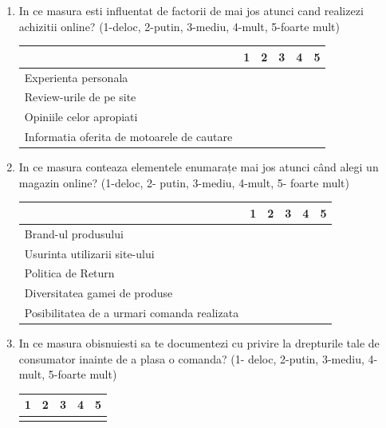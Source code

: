 \documentclass[a4paper, 12pt]{article}
\begin{document}
\begin{enumerate}
	\item In ce masura esti influentat de factorii de mai jos atunci cand realizezi achizitii online? (1-deloc, 2-putin, 3-mediu, 4-mult, 5-foarte mult) 
	\begin{center}
		\begin{tabular}{ | m{19em} | m{1cm}| m{1cm} | m{1cm}| m{1cm} | m{1cm} |} 
			\hline
			& 1 & 2 & 3 & 4 & 5\\ 
			\hline
			Experienta personala  &  &  &  & & \\ 
			\hline
			Review-urile de pe site  &  &   &  &  &\\ 
			\hline
			Opiniile celor apropiati &  &   &  & & \\ 
			\hline
			Informatia oferita de motoarele de cautare &  &  &  & & \\ 
			\hline
		\end{tabular}
\newline
	\end{center}
	\item In ce masura conteaza elementele enumarațe mai jos atunci când alegi un magazin online? (1-deloc, 2- putin, 3-mediu, 4-mult, 5- foarte mult) 
	\begin{center}
		\begin{tabular}{ | m{19em} | m{1cm}| m{1cm} | m{1cm}| m{1cm} | m{1cm} |} 
			\hline
			& 1 & 2 & 3 & 4 & 5\\ 
			\hline
		
			  Brand-ul produsului &  &  &  & & \\ 
			\hline
			 Usurinta utilizarii site-ului &  &   &  &  &\\ 
			\hline
		     Politica de Return&  &   &  & & \\ 
			\hline
			 Diversitatea gamei de produse&  &  &  & & \\ 
			\hline
			Posibilitatea de a urmari comanda realizata&  &  &  & & \\
			\hline
		\end{tabular}
\newline
	\end{center}
	\item In ce masura obisnuiesti sa te documentezi cu privire la drepturile tale de consumator inainte de a plasa o comanda?  (1- deloc, 2-putin, 3-mediu, 4-mult, 5-foarte mult)
	\begin{center}
		\begin{tabular}{ | m{3.5em} | m{1.5cm}| m{1.5cm} | m{1.5cm}| m{1.5cm} | } 
			\hline
			1 & 2 & 3 & 4 & 5 \\ 
			\hline
			  &  &  & &  \\
			\hline
		\end{tabular}
\newline
	\end{center}


\end{enumerate}
\end{document}

